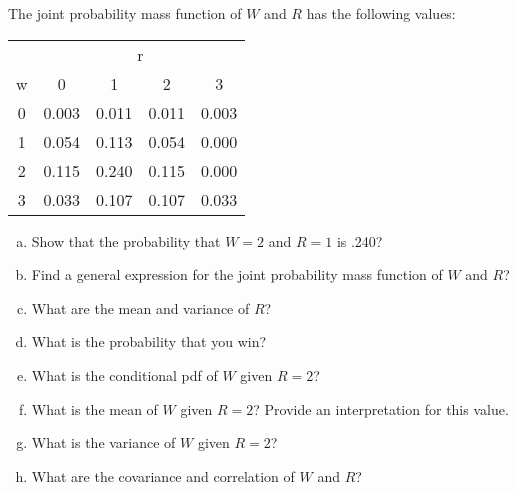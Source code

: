 \begin{frame}

\begin{block}{\exercisectd}
The joint probability mass function of $W$ and $R$ has the following values:
\begin{center}

\begin{tabular}{c|c|c|c|c}
\hline
\multicolumn{1}{c|}{} & \multicolumn{4}{c}{r} \\
w & 0 & 1 & 2 & 3\\
\hline
0 & 0.003 & 0.011 & 0.011 & 0.003\\
\hline
1 & 0.054 & 0.113 & 0.054 & 0.000\\
\hline
2 & 0.115 & 0.240 & 0.115 & 0.000\\
\hline
3 & 0.033 & 0.107 & 0.107 & 0.033\\
\hline
\end{tabular}


\end{center}
\end{block}
\end{frame}

\begin{frame}

\begin{block}{\exercisectd}
\begin{enumerate}[a)]
\item Show that the probability that $W=2$ and $R=1$ is .240?
\item Find a general expression for the joint probability mass function of $W$ and $R$?
\item What are the mean and variance of $R$?
\item What is the probability that you win?
\item What is the conditional pdf of $W$ given $R=2$?
\item What is the mean of $W$ given $R=2$? Provide an interpretation for this value.
\item What is the variance of $W$ given $R=2$?
\item What are the covariance and correlation of $W$ and $R$?
\end{enumerate}
\end{block}
\end{frame}


